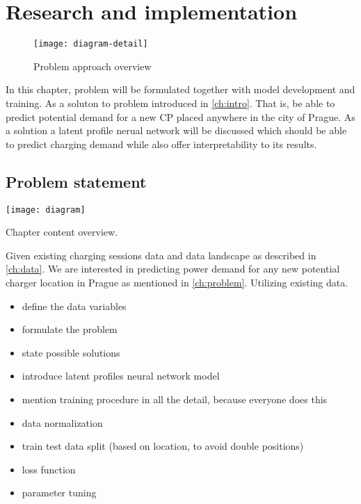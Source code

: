 \chapter{Research and implementation}
\label{ch:problem}

\begin{figure}[hb]
    \texttt{[image: diagram-detail]}
    \caption[Problem modelling overview]{Problem approach overview}
\end{figure}

In this chapter, problem will be formulated together with model development and training. As a soluton to problem introduced in \ref{ch:intro}. That is, be able to predict potential demand for a new \acrfull{CP} placed anywhere in the city of Prague. As a solution a latent profile nerual network will be discussed which should be able to predict charging demand while also offer interpretability to its results.

\section{Problem statement}

\begin{marginfigure}
    \texttt{[image: diagram]}
    \caption[Problem modelling overview]{Chapter content overview.}
\end{marginfigure}

Given existing charging sessions data and data landscape as described in \autoref{ch:data}. We are interested in predicting power demand for any new potential charger location in Prague as mentioned in \autoref{ch:problem}. Utilizing existing data.

\begin{itemize}
    \item define the data variables
    \item formulate the problem
    \item state possible solutions
    \item introduce latent profiles neural network model
    \item mention training procedure in all the detail, because everyone does this
    \item data normalization
    \item train test data split (based on location, to avoid double positions)
    \item loss function
    \item parameter tuning
\end{itemize}

